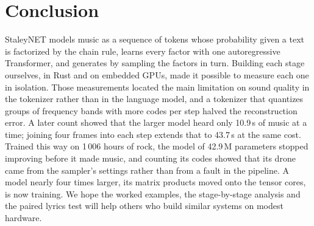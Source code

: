 \section{Conclusion}
\label{sec:conclusion}

StaleyNET models music as a sequence of tokens whose probability given a text
is factorized by the chain rule, learns every factor with one autoregressive
Transformer, and generates by sampling the factors in turn. Building each
stage ourselves, in Rust and on embedded GPUs, made it possible to measure each
one in isolation. Those measurements located the main limitation on sound
quality in the tokenizer rather than in the language model, and a tokenizer
that quantizes groups of frequency bands with more codes per step halved the
reconstruction error. A later count showed that the larger model heard only
10.9\,s of music at a time; joining four frames into each step extends that
to 43.7\,s at the same cost. Trained this way on 1\,006 hours of rock, the
model of 42.9\,M parameters stopped improving before it made music, and
counting its codes showed that its drone came from the sampler's settings
rather than from a fault in the pipeline. A model nearly four times larger,
its matrix products moved onto the tensor cores, is now training. We hope the worked
examples, the stage-by-stage analysis and the paired lyrics test will help
others who build similar systems on modest hardware.

\FloatBarrier
